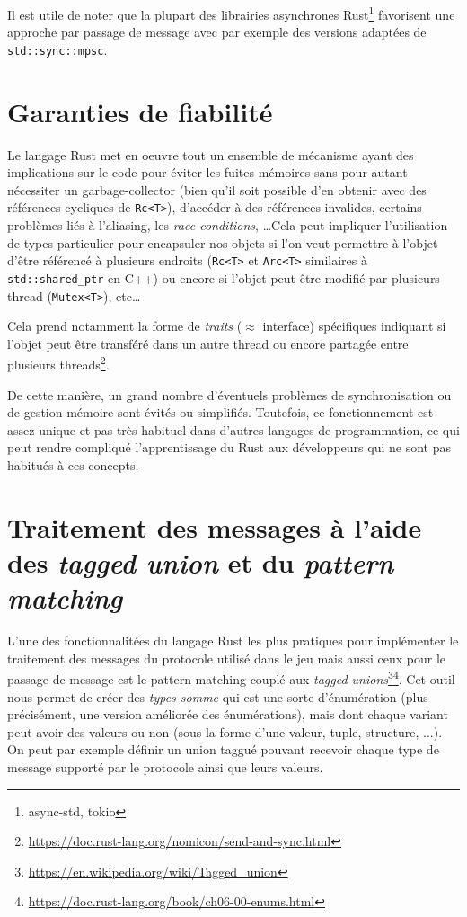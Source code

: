 \documentclass{EPUProjetDi}
\begin{document}
Il est utile de noter que la plupart des librairies asynchrones Rust\footnote{async-std, tokio} favorisent une approche par passage de message avec par exemple des versions adaptées de \verb|std::sync::mpsc|.

\section{Garanties de fiabilité}

Le langage Rust met en oeuvre tout un ensemble de mécanisme ayant des implications sur le code pour éviter les fuites mémoires sans pour autant nécessiter un garbage-collector (bien qu'il soit possible d'en obtenir avec des références cycliques de \verb|Rc<T>|), d'accéder à des références invalides, certains problèmes liés à l'aliasing, les \textit{race conditions}, \dots Cela peut impliquer l'utilisation de types particulier pour encapsuler nos objets si l'on veut permettre à l'objet d'être référencé à plusieurs endroits (\verb|Rc<T>| et \verb|Arc<T>| similaires à \verb|std::shared_ptr| en C++) ou encore si l'objet peut être modifié par plusieurs thread (\verb|Mutex<T>|), etc\dots

Cela prend notamment la forme de \textit{traits} ($\approx$ interface) spécifiques indiquant si l'objet peut être transféré dans un autre thread ou encore partagée entre plusieurs threads\footnote{\url{https://doc.rust-lang.org/nomicon/send-and-sync.html}}.

De cette manière, un grand nombre d'éventuels problèmes de synchronisation ou de gestion mémoire sont évités ou simplifiés. Toutefois, ce fonctionnement est assez unique et pas très habituel dans d'autres langages de programmation, ce qui peut rendre compliqué l'apprentissage du Rust aux développeurs qui ne sont pas habitués à ces concepts.

\section{Traitement des messages à l'aide des \textit{tagged union} et du \textit{pattern matching}}

L'une des fonctionnalitées du langage Rust les plus pratiques pour implémenter le traitement des messages du protocole utilisé dans le jeu mais aussi ceux pour le passage de message est le pattern matching couplé aux \textit{tagged unions}\footnote{\url{https://en.wikipedia.org/wiki/Tagged_union}}\footnote{\url{https://doc.rust-lang.org/book/ch06-00-enums.html}}. Cet outil nous permet de créer des \textit{types somme} qui est une sorte d'énumération (plus précisément, une version améliorée des énumérations), mais dont chaque variant peut avoir des valeurs ou non (sous la forme d'une valeur, tuple, structure, ...). On peut par exemple définir un union taggué pouvant recevoir chaque type de message supporté par le protocole ainsi que leurs valeurs.
\end{document}
